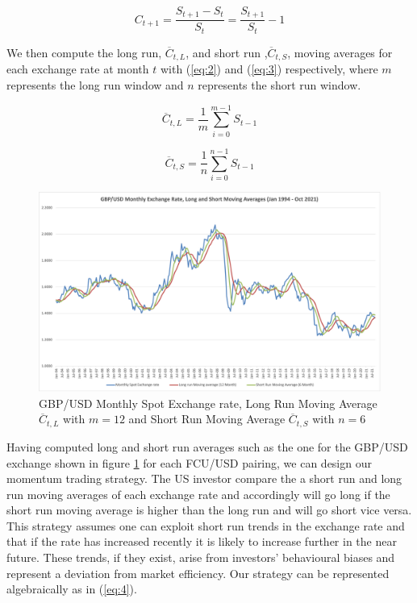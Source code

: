 \documentclass{article}
\begin{document}
\begin{equation}\label{eq:1}
    C_{t+1}=\frac{S_{t+1}-S_{t}}{S_{t}} = \frac{S_{t+1}}{S_{t}}-1
\end{equation}

We then compute the long run, $\overline{C}_{t,L}$, and short run ,$\overline{C}_{t,S}$, moving averages for each exchange rate at month $t$ with (\ref{eq:2}) and (\ref{eq:3}) respectively, where $m$ represents the long run window and $n$ represents the short run window. 

\begin{minipage}{0.45\textwidth}
\begin{equation}\label{eq:2}
    \overline{C}_{t,L} = \frac{1}{m}\sum_{i=0}^{m-1} S_{t-1}
\end{equation}
\end{minipage}
\hfill
\begin{minipage}{0.45\textwidth}
\begin{equation}\label{eq:3}
    \overline{C}_{t,S}= \frac{1}{n}\sum_{i=0}^{n-1} S_{t-1}
\end{equation}
\end{minipage}

\begin{figure}
    \centering
    \includegraphics[width=0.75\linewidth]{GBP_USD Rates.png}
    \captionsetup{font=small, width = 0.75\linewidth}
    \caption{GBP/USD Monthly Spot Exchange rate, Long Run Moving Average $\overline{C}_{t,L}$ with $m = 12$  and Short Run Moving Average $\overline{C}_{t,S} $ with $ n = 6$}
    \label{fig:GBP/USD}
\end{figure}

Having computed long and short run averages such as the one for the GBP/USD exchange shown in figure \ref{fig:GBP/USD} for each FCU/USD pairing, we can design our momentum trading strategy. The US investor compare the a short run and long run moving averages of each exchange rate and accordingly will go long if the short run moving average is higher than the long run and will go short vice versa. This strategy assumes one can exploit short run trends in the exchange rate and that if the rate has increased recently it is likely to increase further in the near future. These trends, if they exist, arise from investors’ behavioural biases and represent a deviation from market efficiency. Our strategy can be represented algebraically as in (\ref{eq:4}).
\end{document}

